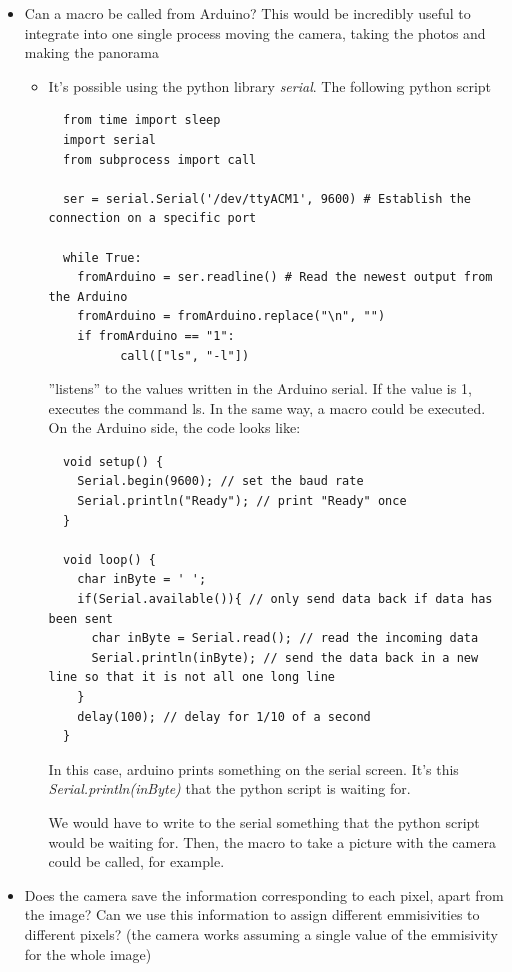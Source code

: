 \documentclass[a4paper,10pt]{article}
\begin{document}
\begin{itemize}
 \item Can a macro be called from Arduino? This would be incredibly useful to integrate into one single process moving the camera, 
 taking the photos and making the panorama
 \begin{itemize}
  \item It's possible using the python library \textit{serial}. The following python script
  \begin{verbatim}
  from time import sleep
  import serial
  from subprocess import call

  ser = serial.Serial('/dev/ttyACM1', 9600) # Establish the connection on a specific port

  while True:
    fromArduino = ser.readline() # Read the newest output from the Arduino
    fromArduino = fromArduino.replace("\n", "")
    if fromArduino == "1":
          call(["ls", "-l"])
  \end{verbatim}
''listens'' to the values written in the Arduino serial. If the value is 1, executes the command ls. In the same way, a macro could
be executed. On the Arduino side, the code looks like:
\begin{verbatim}
  void setup() {
    Serial.begin(9600); // set the baud rate
    Serial.println("Ready"); // print "Ready" once
  }

  void loop() {
    char inByte = ' ';
    if(Serial.available()){ // only send data back if data has been sent
      char inByte = Serial.read(); // read the incoming data
      Serial.println(inByte); // send the data back in a new line so that it is not all one long line
    }
    delay(100); // delay for 1/10 of a second
  }
\end{verbatim}

In this case, arduino prints something on the serial screen. It's this \textit{Serial.println(inByte)} that the python script
is waiting for.

We would have to write to the serial something that the python script would be waiting for. Then, the macro to take
a picture with the camera could be called, for example.

 \end{itemize}

 \item Does the camera save the information corresponding to each pixel, apart from the image? Can we use this information to
 assign different emmisivities to different pixels? (the camera works assuming a single value of the emmisivity for the whole image)
 
\end{itemize}
\end{document}
